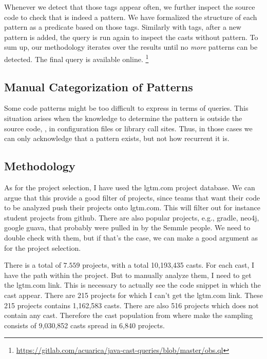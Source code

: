Whenever we detect that those tags appear often,
we further inspect the source code to check that is indeed a pattern.
We have formalized the structure of each pattern as a \ql{} predicate based on those tags.
Similarly with tags, after a new pattern is added,
the query is run again to inspect the casts without pattern.
To sum up, our methodology iterates over the results until
no \emph{more} patterns can be detected.
The final \ql{} query is available online.%
\footnote{\url{https://gitlab.com/acuarica/java-cast-queries/blob/master/obs.ql}}


\subsection*{Manual Categorization of Patterns}

Some code patterns might be too difficult to
express in terms of \ql{} queries.
This situation arises when the knowledge to determine
the pattern is outside the source code,
\eg, in configuration files or library call sites.
Thus, in those cases we can only acknowledge that a pattern exists,
but not how recurrent it is.

\subsection{Methodology}

As for the project selection, I have used the lgtm.com project database.
We can argue that this provide a good filter of projects,
since teams that want their code to be analyzed push their projects onto lgtm.com.
This will filter out for instance student projects from github.
There are also popular projects, e.g., gradle, neo4j, google guava,
that probably were pulled in by the Semmle people.
We need to double check with them, but if that’s the case,
we can make a good argument as for the project selection.

There is a total of $7.559$ projects, with a total 10,193,435 casts.
For each cast, I have the path within the project.
But to manually analyze them, I need to get the lgtm.com link.
This is necessary to actually see the code snippet in which the cast appear.
There are 215 projects for which I can’t get the lgtm.com link.
These 215 projects contains 1,162,583 casts.
There are also 516 projects which does not contain any cast.
Therefore the cast population from where make the sampling consists of
9,030,852 casts spread in 6,840 projects.

